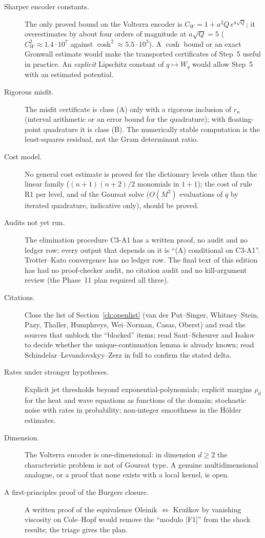 \begin{description}
\item[Sharper encoder constants.] The only proved bound on the Volterra encoder is $C_W=1+a^2Q\,e^{a\sqrt Q}$; it overestimates by about four orders of magnitude at $a\sqrt Q=5$ ($C_W^2\approx1.4\cdot10^7$ against $\cosh^2\approx5.5\cdot10^3$). A $\cosh$ bound or an exact Gronwall estimate would make the transported certificates of Step~5 useful in practice. An \emph{explicit} Lipschitz constant of $q\mapsto W_q$ would allow Step~5 with an estimated potential.
\item[Rigorous misfit.] The misfit certificate is class (A) only with a rigorous inclusion of $r_n$ (interval arithmetic or an error bound for the quadrature); with floating-point quadrature it is class (B). The numerically stable computation is the least-squares residual, not the Gram determinant ratio.
\item[Cost model.] No general cost estimate is proved for the dictionary levels other than the linear family ($(n+1)(n+2)/2$ monomials in $1+1$); the cost of rule R1 per level, and of the Goursat solve ($O(M^2)$ evaluations of $q$ by iterated quadrature, indicative only), should be proved.
\item[Audits not yet run.] The elimination procedure C3-A1 has a written proof, no audit and no ledger row; every output that depends on it is ``(A) conditional on C3-A1''. Trotter--Kato convergence has no ledger row. The final text of this edition has had no proof-checker audit, no citation audit and no kill-argument review (the Phase~11 plan required all three).
\item[Citations.] Close the list of Section~\ref{ch:openlist} (van der Put--Singer, Whitney--Stein, Pazy, Thaller, Humphreys, Wei--Norman, Casas, Oberst) and read the sources that unblock the ``blocked'' items; read Saut--Scheurer and Isakov to decide whether the unique-continuation lemma is already known; read Schindelar--Levandovskyy--Zerz in full to confirm the stated delta.
\item[Rates under stronger hypotheses.] Explicit jet thresholds beyond exponential-polynomials; explicit margins $\rho_d$ for the heat and wave equations as functions of the domain; stochastic noise with rates in probability; non-integer smoothness in the Hölder estimates.
\item[Dimension.] The Volterra encoder is one-dimensional: in dimension $d\ge2$ the characteristic problem is not of Goursat type. A genuine multidimensional analogue, or a proof that none exists with a local kernel, is open.
\item[A first-principles proof of the Burgers closure.] A written proof of the equivalence Oleinik $\Leftrightarrow$ Kru\v zkov by vanishing viscosity on Cole--Hopf would remove the ``modulo [F1]'' from the shock results; the triage gives the plan.
\end{description}

